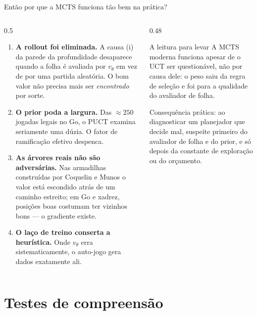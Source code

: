 \documentclass[aspectratio=169, 10pt]{beamer}
\newcommand{\redeval}{v_{\theta}}
\begin{document}
\begin{frame}{Então por que a MCTS funciona tão bem na prática?}
  \footnotesize
  \begin{columns}[T]
    \begin{column}{0.5\textwidth}
      \begin{enumerate}\setlength{\itemsep}{0.4em}
        \item \textbf{A rollout foi eliminada.} A causa (i) da parede da
              profundidade desaparece quando a folha é avaliada por $\redeval$ em
              vez de por uma partida aleatória. O bom valor não precisa mais ser
              \emph{encontrado} por sorte.
        \item \textbf{O prior poda a largura.} Das $\approx 250$ jogadas legais no
              Go, o PUCT examina seriamente uma dúzia. O fator de ramificação
              efetivo despenca.
        \item \textbf{As árvores reais não são adversárias.} Nas armadilhas
              construídas por Coquelin e Munos o valor está escondido atrás de um
              caminho estreito; em Go e xadrez, posições boas costumam ter vizinhos
              bons --- o gradiente existe.
        \item \textbf{O laço de treino conserta a heurística.} Onde $\redeval$
              erra sistematicamente, o auto-jogo gera dados exatamente ali.
      \end{enumerate}
    \end{column}
    \begin{column}{0.48\textwidth}
      \begin{teobox}{A leitura para levar}
        A MCTS moderna funciona apesar de o UCT ser questionável, não por causa
        dele: o peso saiu da regra de seleção e foi para a \alert{qualidade do
        avaliador de folha}.
      \end{teobox}
      \begin{alertabox}
        Consequência prática: ao diagnosticar um planejador que decide mal,
        suspeite primeiro do avaliador de folha e do prior, e só depois da
        constante de exploração ou do orçamento.
      \end{alertabox}
    \end{column}
  \end{columns}
\end{frame}

\section{Testes de compreensão}
\end{document}
